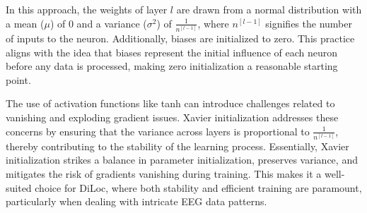 \documentclass[a4paper, UKenglish, 11pt]{uiomaster}
\begin{document}
In this approach, the weights of layer $l$ are drawn from a normal distribution with a mean ($\mu$) of 0 and a variance ($\sigma^2$) of $\frac{1}{n^{[l-1]}}$, where $n^{[l-1]}$ signifies the number of inputs to the neuron. Additionally, biases are initialized to zero. This practice aligns with the idea that biases represent the initial influence of each neuron before any data is processed, making zero initialization a reasonable starting point.

The use of activation functions like tanh can introduce challenges related to vanishing and exploding gradient issues. Xavier initialization addresses these concerns by ensuring that the variance across layers is proportional to $\frac{1}{n^{[l-1]}}$, thereby contributing to the stability of the learning process. Essentially, Xavier initialization strikes a balance in parameter initialization, preserves variance, and mitigates the risk of gradients vanishing during training. This makes it a well-suited choice for DiLoc, where both stability and efficient training are paramount, particularly when dealing with intricate EEG data patterns.
\end{document}
